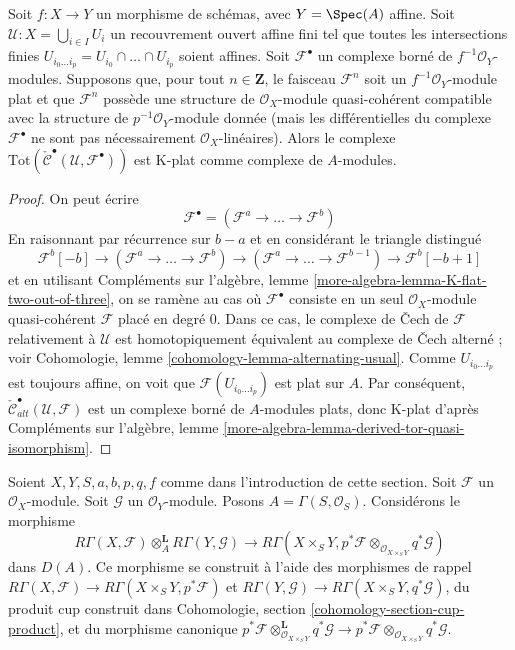 \begin{lemma}
\label{lemma-K-flat}
Soit $f : X \to Y$ un morphisme de schémas, avec $Y = \Spec(A)$ affine.
Soit $\mathcal{U} : X = \bigcup_{i \in I} U_i$ un recouvrement ouvert affine fini
tel que toutes les intersections finies
$U_{i_0 \ldots i_p} = U_{i_0} \cap \ldots \cap U_{i_p}$
soient affines. Soit $\mathcal{F}^\bullet$ un complexe borné de
$f^{-1}\mathcal{O}_Y$-modules. Supposons que, pour tout $n \in \mathbf{Z}$,
le faisceau $\mathcal{F}^n$ soit un $f^{-1}\mathcal{O}_Y$-module plat et que
$\mathcal{F}^n$ possède une structure de $\mathcal{O}_X$-module quasi-cohérent
compatible avec la structure de $p^{-1}\mathcal{O}_Y$-module donnée (mais les
différentielles du complexe $\mathcal{F}^\bullet$ ne sont pas nécessairement
$\mathcal{O}_X$-linéaires). Alors le complexe
$\text{Tot}(\check{\mathcal{C}}^\bullet(\mathcal{U}, \mathcal{F}^\bullet))$
est K-plat comme complexe de $A$-modules.
\end{lemma}

\begin{proof}
On peut écrire
$$
\mathcal{F}^\bullet = (\mathcal{F}^a \to \ldots \to \mathcal{F}^b)
$$
En raisonnant par récurrence sur $b - a$ et en considérant le triangle distingué
$$
\mathcal{F}^b[-b] \to (\mathcal{F}^a \to \ldots \to \mathcal{F}^b)
\to (\mathcal{F}^a \to \ldots \to \mathcal{F}^{b - 1}) \to
\mathcal{F}^b[-b + 1]
$$
et en utilisant
Compléments sur l'algèbre, lemme \ref{more-algebra-lemma-K-flat-two-out-of-three},
on se ramène au cas où $\mathcal{F}^\bullet$ consiste en un seul
$\mathcal{O}_X$-module quasi-cohérent $\mathcal{F}$
placé en degré $0$. Dans ce cas, le complexe de {\v C}ech
de $\mathcal{F}$ relativement à $\mathcal{U}$ est homotopiquement équivalent au
complexe de {\v C}ech alterné ; voir
Cohomologie, lemme \ref{cohomology-lemma-alternating-usual}.
Comme $U_{i_0 \ldots i_p}$ est toujours affine, on voit que
$\mathcal{F}(U_{i_0 \ldots i_p})$ est plat sur $A$.
Par conséquent,
$\check{\mathcal{C}}_{alt}^\bullet(\mathcal{U}, \mathcal{F})$
est un complexe borné de $A$-modules plats, donc K-plat
d'après Compléments sur l'algèbre, lemme
\ref{more-algebra-lemma-derived-tor-quasi-isomorphism}.
\end{proof}

\noindent
Soient $X, Y, S, a, b, p, q, f$ comme dans l'introduction de cette section.
Soit $\mathcal{F}$ un $\mathcal{O}_X$-module.
Soit $\mathcal{G}$ un $\mathcal{O}_Y$-module.
Posons $A = \Gamma(S, \mathcal{O}_S)$.
Considérons le morphisme
\begin{equation}
\label{equation-kunneth-single-sheaves}
R\Gamma(X, \mathcal{F})
\otimes_A^\mathbf{L}
R\Gamma(Y, \mathcal{G})
\longrightarrow
R\Gamma(X \times_S Y,
p^*\mathcal{F}
\otimes_{\mathcal{O}_{X \times_S Y}}
q^*\mathcal{G})
\end{equation}
dans $D(A)$. Ce morphisme se construit à l'aide des morphismes de rappel
$R\Gamma(X, \mathcal{F}) \to R\Gamma(X \times_S Y, p^*\mathcal{F})$ et
$R\Gamma(Y, \mathcal{G}) \to R\Gamma(X \times_S Y, q^*\mathcal{G})$,
du produit cup construit dans
Cohomologie, section \ref{cohomology-section-cup-product}, et
du morphisme canonique
$p^*\mathcal{F}
\otimes_{\mathcal{O}_{X \times_S Y}}^\mathbf{L}
q^*\mathcal{G}
\to
p^*\mathcal{F}
\otimes_{\mathcal{O}_{X \times_S Y}}
q^*\mathcal{G}$.


